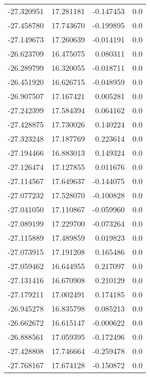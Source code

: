 \begin{tabular}{rrrr}
      -27.320951 &        17.281181 &   -0.147453 &   0.0 \\
      -27.458780 &        17.743670 &   -0.199895 &   0.0 \\
      -27.149673 &        17.260639 &   -0.014191 &   0.0 \\
      -26.623709 &        16.475075 &    0.080311 &   0.0 \\
      -26.289799 &        16.320055 &   -0.018711 &   0.0 \\
      -26.451920 &        16.626715 &   -0.048959 &   0.0 \\
      -26.907507 &        17.167421 &    0.005281 &   0.0 \\
      -27.242399 &        17.584394 &    0.064162 &   0.0 \\
      -27.428875 &        17.730026 &    0.140224 &   0.0 \\
      -27.323248 &        17.187769 &    0.223614 &   0.0 \\
      -27.194466 &        16.883013 &    0.149324 &   0.0 \\
      -27.126474 &        17.127855 &    0.011676 &   0.0 \\
      -27.114567 &        17.649637 &   -0.144075 &   0.0 \\
      -27.077232 &        17.528070 &   -0.100828 &   0.0 \\
      -27.041050 &        17.110867 &   -0.059960 &   0.0 \\
      -27.089199 &        17.229700 &   -0.073264 &   0.0 \\
      -27.115889 &        17.489859 &    0.019823 &   0.0 \\
      -27.073915 &        17.191208 &    0.165486 &   0.0 \\
      -27.059462 &        16.644955 &    0.217097 &   0.0 \\
      -27.131416 &        16.670908 &    0.210129 &   0.0 \\
      -27.179211 &        17.002491 &    0.174185 &   0.0 \\
      -26.945278 &        16.835798 &    0.085213 &   0.0 \\
      -26.662672 &        16.615147 &   -0.000622 &   0.0 \\
      -26.888561 &        17.059395 &   -0.172496 &   0.0 \\
      -27.428808 &        17.746664 &   -0.259478 &   0.0 \\
      -27.768167 &        17.674128 &   -0.150872 &   0.0 \\

\end{tabular}
